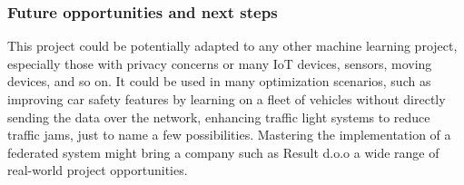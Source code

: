 \subsubsection{Future opportunities and next steps}


This project could be potentially adapted to any other machine learning project, especially those with privacy concerns or many IoT devices, sensors, moving devices, and so on. It could be used in many optimization scenarios, such as improving car safety features by learning on a fleet of vehicles without directly sending the data over the network, enhancing traffic light systems to reduce traffic jams, just to name a few possibilities. Mastering the implementation of a federated system might bring a company such as Result d.o.o a wide range of real-world project opportunities.

%
%
